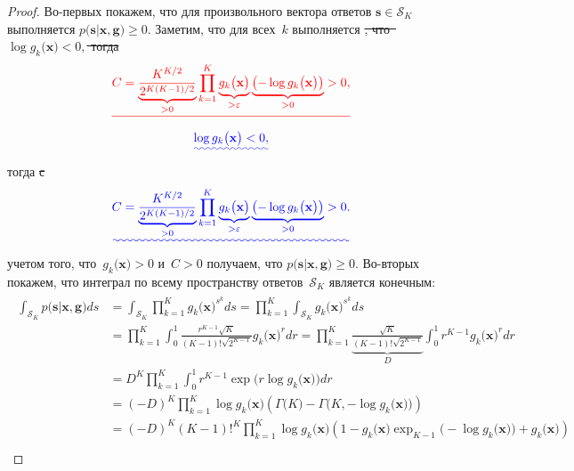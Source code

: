 \documentclass[12pt]{a&t}
\providecommand{\DIFadd}[1]{{\protect\color{blue}\uwave{#1}}} %
\providecommand{\DIFdel}[1]{{\protect\color{red}\sout{#1}}}                      %
\providecommand{\DIFaddbegin}{} %
\providecommand{\DIFaddend}{} %
\providecommand{\DIFdelbegin}{} %
\providecommand{\DIFdelend}{} %
\newcommand{\DIFscaledelfig}{0.5}
\newlength{\DIFdelgraphicswidth} %
\newlength{\DIFdelgraphicsheight} %
\newcommand{\DIFaddincludegraphics}[2][]{{\color{blue}\fbox{\DIFOincludegraphics[#1]{#2}}}} %
\newcommand{\DIFdelincludegraphics}[2][]{%
\sbox{\DIFdelgraphicsbox}{\DIFOincludegraphics[#1]{#2}}%
\settoboxwidth{\DIFdelgraphicswidth}{\DIFdelgraphicsbox} %
\settoboxtotalheight{\DIFdelgraphicsheight}{\DIFdelgraphicsbox} %
\scalebox{\DIFscaledelfig}{%
\parbox[b]{\DIFdelgraphicswidth}{\usebox{\DIFdelgraphicsbox}\\[-\baselineskip] \rule{\DIFdelgraphicswidth}{0em}}\llap{\resizebox{\DIFdelgraphicswidth}{\DIFdelgraphicsheight}{%
\setlength{\unitlength}{\DIFdelgraphicswidth}%
\begin{picture}(1,1)%
\thicklines\linethickness{2pt} %
{\color[rgb]{1,0,0}\put(0,0){\framebox(1,1){}}}%
{\color[rgb]{1,0,0}\put(0,0){\line( 1,1){1}}}%
{\color[rgb]{1,0,0}\put(0,1){\line(1,-1){1}}}%
\end{picture}%
}\hspace*{3pt}}} %
} %
\DeclareRobustCommand{\DIFaddbegin}{\DIFOaddbegin \let\includegraphics\DIFaddincludegraphics} %
\DeclareRobustCommand{\DIFaddend}{\DIFOaddend \let\includegraphics\DIFOincludegraphics} %
\DeclareRobustCommand{\DIFdelbegin}{\DIFOdelbegin \let\includegraphics\DIFdelincludegraphics} %
\DeclareRobustCommand{\DIFdelend}{\DIFOaddend \let\includegraphics\DIFOincludegraphics} %
\begin{document}
\begin{proof}
	Во-первых покажем, что для произвольного вектора ответов $\mathbf{s} \in \mathcal{S}_K$ выполняется $p\bigr(\mathbf{s}|\mathbf{x}, \mathbf{g}\bigr) \geq 0$. Заметим, что для всех~$k$ выполняется
	\DIFdelbegin \DIFdel{, что~$\log g_k\bigr(\mathbf{x}\bigr) < 0,$ тогда
}\begin{eqnarray*}
\DIFdel{\begin{aligned}
	C=\underbrace{\frac{K^{K/2}}{2^{K(K-1)/2}}}_{>0}\prod_{k=1}^{K}\underbrace{g_k\bigr(\mathbf{x}\bigr)}_{>\varepsilon}\underbrace{\left(-\log g_k\bigr(\mathbf{x}\bigr)\right)}_{>0} > 0,
\end{aligned}
}\end{eqnarray*}%
\DIFdelend \DIFaddbegin \[\DIFadd{\log g_k\bigr(\mathbf{x}\bigr) < 0,}\]\DIFaddend  тогда
\DIFdelbegin \DIFdel{с }\DIFdelend \DIFaddbegin \begin{gather}
\DIFadd{\begin{aligned}
	C=\underbrace{\frac{K^{K/2}}{2^{K(K-1)/2}}}_{>0}\prod_{k=1}^{K}\underbrace{g_k\bigr(\mathbf{x}\bigr)}_{>\varepsilon}\underbrace{\left(-\log g_k\bigr(\mathbf{x}\bigr)\right)}_{>0} > 0.
\end{aligned}
}\end{gather}
\DIFadd{С }\DIFaddend учетом того, что~$g_k\bigr(\mathbf{x}\bigr) >0$ и~$C>0$ получаем, что $p\bigr(\mathbf{s}|\mathbf{x}, \mathbf{g}\bigr) \geq 0$.
	Во-вторых покажем, что интеграл по всему пространству ответов~$\mathcal{S}_K$ является конечным:
	\begin{gather}
	\label{theorem:st:dist:eq:1}
	\begin{aligned}
		\int_{\mathcal{S}_K}p\bigr(\mathbf{s}|\mathbf{x}, \mathbf{g}\bigr)ds &= \int_{\mathcal{S}_K}\prod_{k=1}^{K}g_k\bigr(\mathbf{x}\bigr)^{s^k}ds = \prod_{k=1}^{K}\int_{\mathcal{S}_K}g_k\bigr(\mathbf{x}\bigr)^{s^k}ds\\ 
		& = \prod_{k=1}^{K}\int_{0}^{1}\frac{r^{K-1}\sqrt{K}}{\left(K-1\right)!\sqrt{2^{K-1}}}g_k\bigr(\mathbf{x}\bigr)^{r}dr = \prod_{k=1}^{K}\underbrace{\frac{\sqrt{K}}{\left(K-1\right)!\sqrt{2^{K-1}}}}_{D}\int_{0}^{1}r^{K-1}g_k\bigr(\mathbf{x}\bigr)^{r}dr \\
		& = D^K\prod_{k=1}^{K} \int_{0}^{1}r^{K-1}\exp\bigr(r\log g_k\bigr(\mathbf{x}\bigr)\bigr)dr \\
		& = \left(-D\right)^K\prod_{k=1}^{K}\log g_k\bigr(\mathbf{x}\bigr)\left(\Gamma\bigr(K\bigr) - \Gamma\bigr(K, -\log g_k\bigr(\mathbf{x}\bigr)\bigr)\right) \\
		& = \left(-D\right)^K\left(K-1\right)!^K\prod_{k=1}^{K}\log g_k\bigr(\mathbf{x}\bigr)\left(1 -g_k\bigr(\mathbf{x}\bigr) \exp_{K-1}\bigr(-\log g_k\bigr(\mathbf{x}\bigr)\bigr)+g_k\bigr(\mathbf{x}\bigr)\right) \\

\end{aligned}
\end{gather}
\end{proof}
\end{document}
